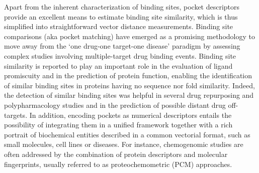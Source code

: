 Apart from the inherent characterization of binding sites, pocket descriptors provide an excellent means to estimate binding site similarity, which is thus simplified into straightforward vector distance measurements. Binding site comparisons (aka pocket matching) have emerged as a promising methodology to move away from the ‘one drug-one target-one disease’ paradigm\cite{morphy_magic_2004} by assessing complex studies involving multiple-target drug binding events\cite{konc_binding_2019, naderi_binding_2019, zhang_computational_2017}. Binding site similarity is reported to play an important role in the evaluation of ligand promiscuity\cite{haupt_drug_2013} and in the prediction of protein function, enabling the identification of similar binding sites in proteins having no sequence nor fold similarity\cite{konc_binding_2014}. Indeed, the detection of similar binding sites was helpful in several drug repurposing and polypharmacology studies\cite{duran-frigola_detecting_2017, ehrt_impact_2016, jalencas_identification_2013, salentin_polypharmacology_2014, zhao_delineation_2016} and in the prediction of possible distant drug off-targets\cite{schumann_identification_2013}. In addition, encoding pockets as numerical descriptors entails the possibility of integrating them in a unified framework together with a rich portrait of biochemical entities described in a common vectorial format, such as small molecules, cell lines or diseases\cite{fernandez-torras_connecting_2022}. For instance, chemogenomic studies are often addressed by the combination of protein descriptors and molecular fingerprints, usually referred to as proteochemometric (PCM) approaches\cite{bongers_proteochemometrics_2019, dsouza_machine_2020}.

